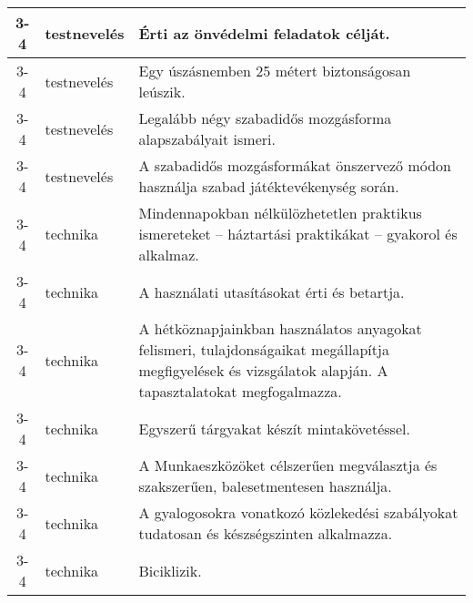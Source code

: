 \begin{small}
\begin{longtable}{c | p{2cm} |  p{11cm} }
              3-4 & testnevelés & Érti az önvédelmi feladatok célját. \\ \hline
              3-4 & testnevelés & Egy úszásnemben 25 métert biztonságosan leúszik. \\ \hline
              3-4 & testnevelés & Legalább négy szabadidős mozgásforma alapszabályait ismeri. \\ \hline
              3-4 & testnevelés & A szabadidős mozgásformákat önszervező módon használja szabad játéktevékenység során. \\ \hline
              3-4 & technika & Mindennapokban nélkülözhetetlen praktikus ismereteket – háztartási praktikákat – gyakorol és alkalmaz. \\ \hline
              3-4 & technika & A használati utasításokat érti és betartja. \\ \hline
              3-4 & technika & A hétköznapjainkban használatos anyagokat felismeri, tulajdonságaikat megállapítja megfigyelések és vizsgálatok alapján. A tapasztalatokat megfogalmazza. \\ \hline
              3-4 & technika & Egyszerű tárgyakat készít mintakövetéssel. \\ \hline
              3-4 & technika & A Munkaeszközöket célszerűen megválasztja és szakszerűen, balesetmentesen használja. \\ \hline
              3-4 & technika & A gyalogosokra vonatkozó közlekedési szabályokat tudatosan és készségszinten alkalmazza. \\ \hline
              3-4 & technika & Biciklizik. \\ \hline
      \end{longtable}
\end{small}


